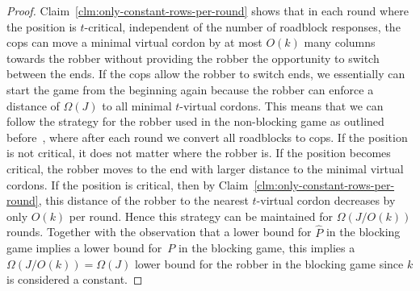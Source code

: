 \documentclass[10pt,a4paper]{article}
\begin{document}
\begin{proof}
	
	\noindent Claim~\ref{clm:only-constant-rows-per-round} shows that in each round where the position is $t$-critical,
	independent of the number of roadblock responses,
	the cops can move a minimal virtual cordon by at most $O(k)$ many columns towards the robber
	without providing the robber the opportunity to switch  between the ends.
	If the cops allow the robber to switch ends, we essentially can start the game from the beginning again
	because the robber can enforce a distance of $\Omega(J)$ to all minimal $t$-virtual cordons.
	This means that we can follow the strategy for the robber used in the non-blocking game as outlined before~\cite{RFJN024},
	where after each round we convert all roadblocks to cops.
	If the position is not critical, it does not matter where the robber is.
	If the position becomes critical, the robber moves to the end with larger
	distance to the minimal virtual cordons.
	If the position is critical,
	then by Claim~\ref{clm:only-constant-rows-per-round}, this distance of the robber to the nearest $t$-virtual cordon decreases by only $O(k)$ per round.
	Hence this strategy can be maintained for $\Omega(J/O(k))$ rounds.
	Together with the observation that a lower bound for $\hat{P}$
	in the blocking game implies a lower bound for~$P$ in the blocking game,
	this implies a $\Omega(J/O(k))=\Omega(J)$ lower bound for the robber in the
	blocking game since $k$ is considered a constant.
\end{proof} 
\end{document}
